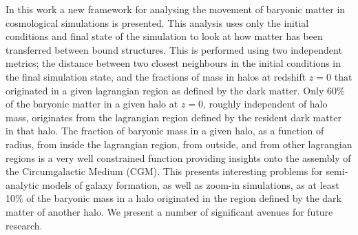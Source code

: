 In this work a new framework for analysing the movement of baryonic matter in
cosmological simulations is presented. This analysis uses only the initial
conditions and final state of the simulation to look at how matter has been
transferred between bound structures. This is performed using two independent
metrics; the distance between two closest neighbours in the initial conditions
in the final simulation state, and the fractions of mass in halos at redshift
$z=0$ that originated in a given lagrangian region as defined by the dark
matter. Only 60\% of the baryonic matter in a given halo at $z=0$, roughly
independent of halo mass, originates from the lagrangian region defined by the
resident dark matter in that halo. The fraction of baryonic mass in a given
halo, as a  function of radius, from inside the lagrangian region, from
outside, and from other lagrangian regions is a very well constrained function
providing insights onto the assembly of the Circumgalactic Medium (CGM). This
presents interesting problems for semi-analytic models of galaxy formation, as
well as zoom-in simulations, as at least 10\% of the baryonic mass in a halo
originated in the region defined by the dark matter of another halo. We present
a number of significant avenues for future research.